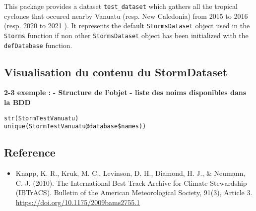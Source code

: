 \documentclass[
]{article}
\providecommand{\tightlist}{%
  \setlength{\itemsep}{0pt}\setlength{\parskip}{0pt}}
\begin{document}
This package provides a dataset \texttt{test\_dataset} which gathers all
the tropical cyclones that occured nearby Vanuatu (resp. New Caledonia)
from 2015 to 2016 (resp. 2020 to 2021 ). It represents the default
\texttt{StormsDataset} object used in the \texttt{Storms} function if
non other \texttt{StormsDataset} object has been initialized with the
\texttt{defDatabase} function.

\hypertarget{visualisation-du-contenu-du-stormdataset}{%
\subsection{Visualisation du contenu du
StormDataset}\label{visualisation-du-contenu-du-stormdataset}}

\textbf{2-3 exemple :} \textbf{- Structure de l'objet}
\textbf{- liste des noims disponibles dans la BDD}

\begin{verbatim}
str(StormTestVanuatu)
unique(StormTestVanuatu@database$names))
\end{verbatim}

\hypertarget{reference}{%
\subsection{Reference}\label{reference}}

\begin{itemize}
\tightlist
\item
  Knapp, K. R., Kruk, M. C., Levinson, D. H., Diamond, H. J., \&
  Neumann, C. J. (2010). The International Best Track Archive for
  Climate Stewardship (IBTrACS). Bulletin of the American Meteorological
  Society, 91(3), Article 3.
  \url{https://doi.org/10.1175/2009bams2755.1}
\end{itemize}
\end{document}
